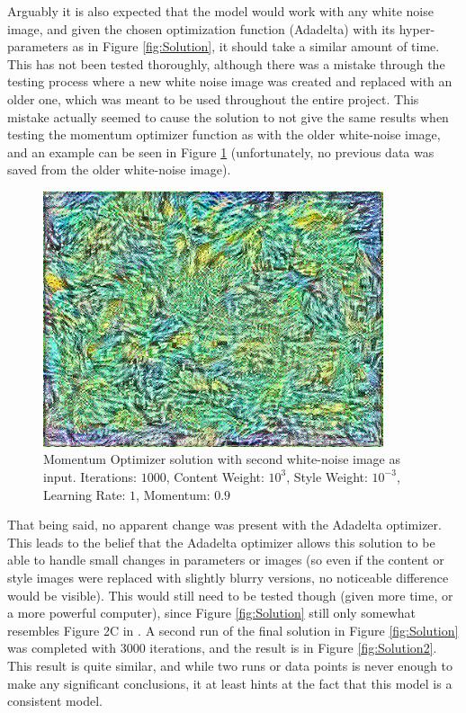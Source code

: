 \documentclass[12pt]{article}
\begin{document}
Arguably it is also expected that the model would work with any white noise image, and given the chosen optimization function (Adadelta) with its hyper-parameters as in Figure \ref{fig:Solution}, it should take a similar amount of time. This has not been tested thoroughly, although there was a mistake through the testing process where a new white noise image was created and replaced with an older one, which was meant to be used throughout the entire project. This mistake actually seemed to cause the solution to not give the same results when testing the momentum optimizer function as with the older white-noise image, and an example can be seen in Figure \ref{fig:SolutionM} (unfortunately, no previous data was saved from the older white-noise image).
\begin{figure}
\centering
  \includegraphics[width=100mm, scale = 0.5]{solution4.jpg}
  \caption{Momentum Optimizer solution with second white-noise image as input. Iterations: $1000$, Content Weight: $10^3$, Style Weight: $10^{-3}$, Learning Rate: $1$, Momentum: $0.9$}
  \label{fig:SolutionM}
\end{figure}
That being said, no apparent change was present with the Adadelta optimizer. This leads to the belief that the Adadelta optimizer allows this solution to be able to handle small changes in parameters or images (so even if the content or style images were replaced with slightly blurry versions, no noticeable difference would be visible). This would still need to be tested though (given more time, or a more powerful computer), since Figure \ref{fig:Solution} still only somewhat resembles Figure 2C in \cite{Neural}. A second run of the final solution in Figure \ref{fig:Solution} was completed with 3000 iterations, and the result is in Figure \ref{fig:Solution2}. This result is quite similar, and while two runs or data points is never enough to make any significant conclusions, it at least hints at the fact that this model is a consistent model. 
\end{document}
